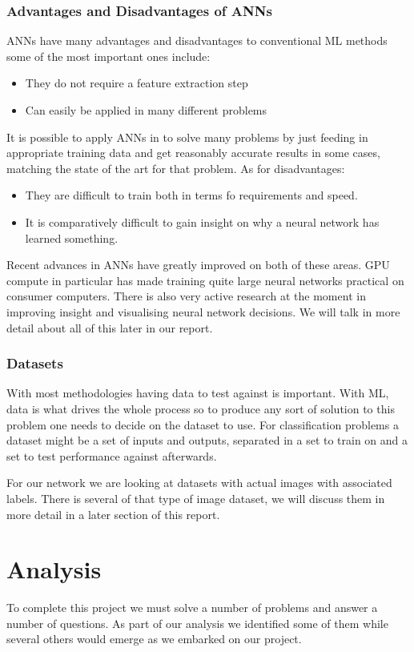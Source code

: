 \subsubsection{Advantages and Disadvantages of ANNs}
ANNs have many advantages and disadvantages to conventional ML methods some of the most important ones include: 
\begin{itemize}
	\item They do not require a feature extraction step
	\item Can easily be applied in many different problems
\end{itemize}
It is possible to apply ANNs in to solve many problems by just feeding in appropriate training data and get reasonably accurate results in some cases, matching the state of the art for that problem. As for disadvantages:
\begin{itemize}
	\item They are difficult to train both in terms fo requirements and speed.
	\item It is comparatively difficult to gain insight on why a neural network has learned something.
\end{itemize}
Recent advances in ANNs have greatly improved on both of these areas. GPU compute in particular has made training quite large neural networks practical on consumer computers. There is also very active research at the moment in improving insight and visualising neural network decisions. We will talk in more detail about all of this later in our report.

\subsubsection{Datasets}
With most methodologies having data to test against is important. With ML, data is what drives the whole process so to produce any sort of solution to this problem one needs to decide on the dataset to use. For classification problems a dataset might be a set of inputs and outputs, separated in a set to train on and a set to test performance against afterwards.

For our network we are looking at datasets with actual images with associated labels. There is several of that type of image dataset, we will discuss them in more detail in a later section of this report.

\section{Analysis}
To complete this project we must solve a number of problems and answer a number of questions. As part of our analysis we identified some of them while several others would emerge as we embarked on our project.

